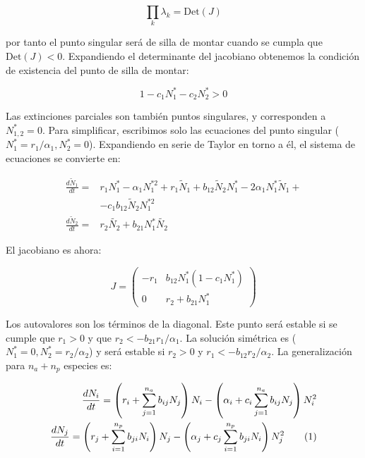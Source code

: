 \begin{equation}
\prod_{k}\lambda_{k}=\mathrm{Det}(J)
\end{equation}

\noindent por tanto el punto singular será de silla de montar cuando se cumpla que  $\mathrm{Det}(J)<0$. Expandiendo el determinante del jacobiano obtenemos la condición de existencia del punto de silla de montar:

\begin{equation}
1-c_{1}N^{*}_{1}-c_{2}N^{*}_{2} >0
\end{equation}

Las extinciones parciales son también puntos singulares, y corresponden a $N^{*}_{1,2} = 0$. Para simplificar, escribimos solo las ecuaciones del punto singular  ($N^{*}_{1}=r_{1}/\alpha_{1},N^{*}_{2}=0$). Expandiendo en serie de Taylor en torno a él, el sistema de ecuaciones se convierte en:

\begin{equation}
\begin{array}{ll}
\displaystyle \frac{d\tilde{N}_{1}}{dt} = & r_{1} N^{*}_{1}-\alpha_{1}N^{*2}_{1}+r_{1}\tilde{N}_{1}+ b_{12}\tilde{N}_{2}N^{*}_1-2\alpha_{1}N^{*}_1\tilde{N}_{1} + \\
\, & - c_{1} b_{12}\tilde{N}_{2}N^{*2}_1\nonumber\\
\displaystyle \frac{d\tilde{N}_{2}}{dt} = & r_{2}\tilde{N_{2}}+ b_{21} N^{*}_1\tilde{N_{2}} 
\end{array}
\label{eq:effrateTaylorN2=0}
\end{equation}

\noindent El jacobiano es ahora:

\begin{equation*}
J = \left(
\begin{array}{rr}
-r_{1} & b_{12}N^{*}_{1}\left(1-c_{1}N^{*}_{1}\right) \\
0 & r_{2}+b_{21}N^{*}_{1}
\end{array}
\right)
\end{equation*}

Los autovalores son los términos de la diagonal. Este punto será estable si se cumple que $r_{1}>0$ y que $r_{2}<-b_{21}r_{1}/\alpha_{1}$. La solución simétrica es ($N^{*}_{1}=0,N^{*}_{2}=r_{2}/\alpha_{2}$) y será estable si  $r_{2}>0$ y $r_{1}<-b_{12}r_{2}/\alpha_{2}$. La generalización para $n_{a} + n_{p}$ especies es:
 
\begin{align}
\frac{dN_{i}}{dt} = \left( r_{i}+ \sum_{j=1}^{n_{a}} b_{ij}N_{j}\right)N_{i} - \left(\alpha_{i}+ c_{i} \sum_{j=1}^{n_{a}} b_{ij}N_{j} \right) N^{2}_{i} \nonumber\\ 
\frac{dN_{j}}{dt} = \left( r_{j}+ \sum_{i=1}^{n_{p}} b_{ji}N_{i}\right)N_{j} - \left(\alpha_{j}+ c_{j} \sum_{i=1}^{n_{p}} b_{ji} N_{i} \right) N^{2}_{j} 
\stepcounter{equation}\tag{\theequation}\label{eq:N_especies}
\end{align}

